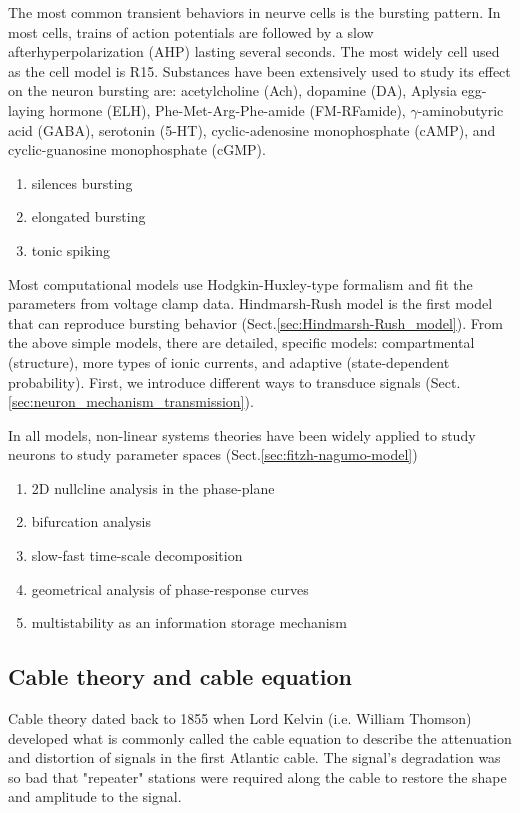 The most common transient behaviors in neurve cells is the bursting pattern.
In most cells, trains of action potentials are followed by a slow
afterhyperpolarization (AHP) lasting several seconds.
The most widely cell used as the cell model is R15. Substances have been
extensively used to study its effect on the neuron bursting are:
acetylcholine (Ach), dopamine (DA), Aplysia egg-laying hormone (ELH),
Phe-Met-Arg-Phe-amide (FM-RFamide), $\gamma$-aminobutyric acid (GABA), serotonin
(5-HT), cyclic-adenosine monophosphate (cAMP), and cyclic-guanosine
monophosphate (cGMP).
\begin{enumerate}
  \item silences bursting
  \item elongated bursting
  \item tonic spiking
\end{enumerate}
 
Most computational models use Hodgkin-Huxley-type formalism and fit the
parameters from voltage clamp data.  Hindmarsh-Rush model is the first model
that can reproduce bursting behavior \citep{hindmarsh1984}
(Sect.\ref{sec:Hindmarsh-Rush_model}). From the above simple models, there are
detailed, specific models: compartmental (structure), more types of ionic
currents, and adaptive (state-dependent probability). First, we introduce
different ways to transduce signals
(Sect.\ref{sec:neuron_mechanism_transmission}).

In all models, non-linear systems theories have been widely applied to study
neurons to study parameter spaces (Sect.\ref{sec:fitzh-nagumo-model})
\begin{enumerate}
  \item 2D nullcline analysis in the phase-plane
  \item bifurcation analysis
  \item slow-fast time-scale decomposition
  \item geometrical analysis of phase-response curves \citep{demir1997}
  \item multistability as an information storage mechanism
\end{enumerate}



\subsection{Cable theory and cable equation}
\label{sec:cable_equation}

Cable theory dated back to 1855 when Lord Kelvin (i.e. William Thomson)
developed what is commonly called the cable equation to describe the attenuation
and distortion of signals in the first Atlantic cable.
The signal's degradation was so bad that "repeater" stations were required along
the cable to restore the shape and amplitude to the signal.

